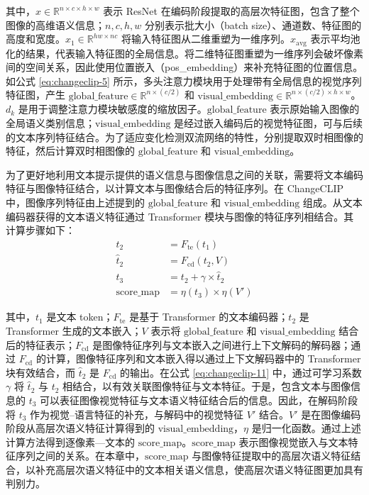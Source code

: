 其中，$x\in\mathbb{R}^{n\times c\times h\times w}$ 表示 ResNet 在编码阶段提取的高层次特征图，包含了整个图像的高维语义信息；$n,c,h,w$ 分别表示批大小（batch size）、通道数、特征图的高度和宽度。$x_1\in\mathbb{R}^{hw\times nc}$ 将输入特征图从二维重塑为一维序列。$x_{\mathrm{avg}}$ 表示平均池化的结果，代表输入特征图的全局信息。将二维特征图重塑为一维序列会破坏像素间的空间关系，因此使用位置嵌入（pos\_embedding）来补充特征图的位置信息。如公式 \eqref{eq:changeclip-5} 所示，多头注意力模块用于处理带有全局信息的视觉序列特征图，产生 $\mathrm{global\_feature}\in\mathbb{R}^{n\times (c/2)}$ 和 $\mathrm{visual\_embedding}\in\mathbb{R}^{n\times (c/2)\times h\times w}$。$d_k$ 是用于调整注意力模块敏感度的缩放因子。$\mathrm{global\_feature}$ 表示原始输入图像的全局语义类别信息；$\mathrm{visual\_embedding}$ 是经过嵌入编码后的视觉特征图，可与后续的文本序列特征结合。为了适应变化检测双流网络的特性，分别提取双时相图像的特征，然后计算双时相图像的 $\mathrm{global\_feature}$ 和 $\mathrm{visual\_embedding}$。

为了更好地利用文本提示提供的语义信息与图像信息之间的关联，需要将文本编码特征与图像特征结合，以计算文本与图像结合后的特征序列。在 ChangeCLIP 中，图像序列特征由上述提到的 \(\mathrm{global\_feature}\) 和 \(\mathrm{visual\_embedding}\) 组成。从文本编码器获得的文本语义特征通过 Transformer 模块与图像的特征序列相结合。其计算步骤如下：
\begin{align}
t_2 &= F_{\mathrm{te}}(t_1) \label{eq:changeclip-9}\\
\hat t_2 &= F_{\mathrm{cd}}(t_2, V) \label{eq:changeclip-10}\\
t_3 &= t_2 + \gamma \times \hat t_2 \label{eq:changeclip-11}\\
\mathrm{score\_map} &= \eta(t_3)\times \eta(V') \label{eq:changeclip-12}
\end{align}

其中，\(t_1\) 是文本 token；\(F_{\mathrm{te}}\) 是基于 Transformer 的文本编码器；\(t_2\) 是 Transformer 生成的文本嵌入；\(V\) 表示将 \(\mathrm{global\_feature}\) 和 \(\mathrm{visual\_embedding}\) 结合后的特征表示；\(F_{\mathrm{cd}}\) 是图像特征序列与文本嵌入之间进行上下文解码的解码器；通过 \(F_{\mathrm{cd}}\) 的计算，图像特征序列和文本嵌入得以通过上下文解码器中的 Transformer 块有效结合，而 \(\hat t_2\) 是 \(F_{\mathrm{cd}}\) 的输出。在公式 \eqref{eq:changeclip-11} 中，通过可学习系数 \(\gamma\) 将 \(\hat t_2\) 与 \(t_2\) 相结合，以有效关联图像特征与文本特征。于是，包含文本与图像信息的 \(t_3\) 可以表征图像视觉特征与文本语义特征结合后的信息。因此，在解码阶段将 \(t_3\) 作为视觉–语言特征的补充，与解码中的视觉特征 \(V'\) 结合。\(V'\) 是在图像编码阶段从高层次语义特征计算得到的 \(\mathrm{visual\_embedding}\)，\(\eta\) 是归一化函数。通过上述计算方法得到逐像素—文本的 \(\mathrm{score\_map}\)。\(\mathrm{score\_map}\) 表示图像视觉嵌入与文本特征序列之间的关系。在本章中，\(\mathrm{score\_map}\) 与图像特征提取中的高层次语义特征结合，以补充高层次语义特征中的文本相关语义信息，使高层次语义特征图更加具有判别力。

